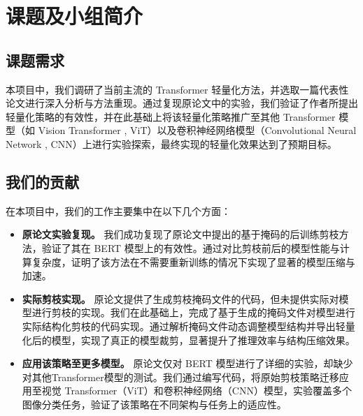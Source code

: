 \documentclass[UTF8,openany]{ctexbook}
\begin{document}
\setcounter{page}{1}

\newpage


\renewcommand{\contentsname}{\centerline{\zihao{-3}\heiti 目\quad 录}}
\tableofcontents
\thispagestyle{empty}
\newpage

\setcounter{page}{1}


\chapter{课题及小组简介}
\section{课题需求}

本项目中，我们调研了当前主流的 Transformer \cite{vaswani2017attention} 轻量化方法，并选取一篇代表性论文进行深入分析与方法重现。通过复现原论文中的实验，我们验证了作者所提出轻量化策略的有效性，并在此基础上将该轻量化策略推广至其他 Transformer 模型（如 Vision Transformer \cite{dosovitskiy2020image}, ViT）以及卷积神经网络模型（Convolutional Neural Network \cite{fukushima1980neocognitron}, CNN）上进行实验探索，最终实现的轻量化效果达到了预期目标。

\section{我们的贡献}

在本项目中，我们的工作主要集中在以下几个方面：

\begin{itemize}[noitemsep=0pt, topsep=0pt, parsep=0pt, partopsep=0pt]
    \item \textbf{原论文实验复现。} 我们成功复现了原论文中提出的基于掩码的后训练剪枝方法，验证了其在 BERT \cite{devlin2019bert} 模型上的有效性。通过对比剪枝前后的模型性能与计算复杂度，证明了该方法在不需要重新训练的情况下实现了显著的模型压缩与加速。
    
    \item \textbf{实际剪枝实现。} 原论文提供了生成剪枝掩码文件的代码，但未提供实际对模型进行剪枝的实现。我们在此基础上，完成了基于生成的掩码文件对模型进行实际结构化剪枝的代码实现。通过解析掩码文件动态调整模型结构并导出轻量化后的模型，实现了真正的模型裁剪，显著提升了推理效率与结构压缩效果。
    
    \item \textbf{应用该策略至更多模型。} 原论文仅对 BERT 模型进行了详细的实验，却缺少对其他Transformer模型的测试。我们通过编写代码，将原始剪枝策略迁移应用至视觉 Transformer（ViT）和卷积神经网络（CNN）模型，实验覆盖多个图像分类任务，验证了该策略在不同架构与任务上的适应性。
\end{itemize}
\end{document}
